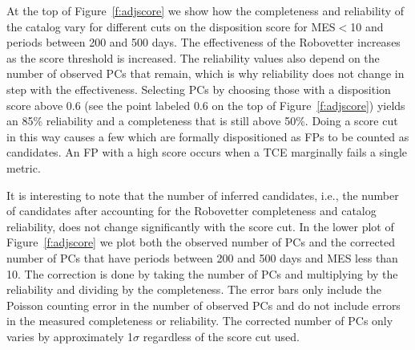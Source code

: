 At the top of Figure~\ref{f:adjscore} we show how the completeness and reliability of the catalog vary for different cuts on the disposition score for MES$<$10 and periods between 200 and 500 days. The effectiveness of the Robovetter increases as the score threshold is increased. The reliability values also depend on the number of observed PCs that remain, which is why reliability does not change in step with the effectiveness. Selecting PCs by choosing those with a disposition score above 0.6 (see the point labeled 0.6 on the top of Figure~\ref{f:adjscore}) yields an 85\% reliability and a completeness that is still above 50\%. Doing a score cut in this way causes a few  which are formally dispositioned as FPs to be counted as candidates. An FP with a high score occurs when a TCE marginally fails a single metric.  

It is interesting to note that the number of inferred candidates, i.e., the number of candidates after accounting for the Robovetter completeness and catalog reliability, does not change significantly with the score cut. In the lower plot of Figure~\ref{f:adjscore} we plot both the observed number of PCs and the corrected number of PCs that have periods between 200 and 500 days and MES less than 10.  The correction is done by taking the number of PCs and multiplying by the reliability and dividing by the completeness.  The error bars only include the Poisson counting error in the number of observed PCs and do not include errors in the measured completeness or reliability. The corrected number of PCs only varies by approximately 1$\sigma$ regardless of the score cut used.   

